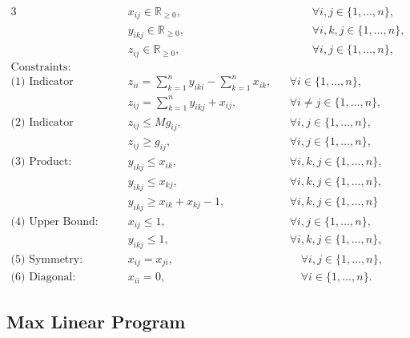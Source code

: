 \documentclass[11pt]{article}
\begin{document}
\begin{alignat}{3}
& x_{ij} \in  \mathbb{R}_{\geq 0}, 
&&\qquad \forall i,j \in \{1, \dots, n\}, \label{eq::LP_x_variable} \\
& y_{ikj} \in \mathbb{R}_{\geq 0}, 
&&\qquad \forall i,k,j \in \{1, \dots, n\}, \label{eq::LP_y_variable} \\
& z_{ij} \in \mathbb{R}_{\geq 0}, 
&&\qquad \forall i,j \in \{1, \dots, n\}, \label{eq::LP_z_variable} \\
\text{Constraints: } & \nonumber \\
\text{(1) Indicator argument: } 
& z_{ii} = \sum_{k = 1}^{n}y_{iki} - \sum_{k = 1}^{n} x_{ik}, 
&& \forall i \in \{1, \dots, n\} , \label{eq::LP_fund_matrix} \\
& z_{ij} = \sum_{k = 1}^{n}y_{ikj} + x_{ij}, 
&& \forall i \neq j \in \{1, \dots, n\} , \label{eq::LP_indicator_arg} \\
\text{(2) Indicator function: } 
& z_{ij} \leq M g_{ij}, 
&& \forall i, j \in \{1, \dots, n\}, \label{eq::LP_indicator_upper} \\
& z_{ij} \geq g_{ij}, 
&& \forall i, j \in \{1, \dots, n\}, \label{eq::LP_indicator_lower}\\
\text{(3) Product: } 
& y_{ikj} \leq x_{ik}, 
&& \forall i, k, j \in \{1, \dots, n\}, \label{eq::LP_product_upper_first} \\
& y_{ikj} \leq x_{kj}, 
&& \forall i, k, j \in \{1, \dots, n\}, \label{eq::LP_product_upper_second} \\
& y_{ikj} \geq x_{ik} + x_{kj} - 1, 
&& \forall i, k, j \in \{1, \dots, n\} \label{eq::LP_product_lower} \\
\text{(4) Upper Bound: } 
& x_{ij} \leq 1, 
&& \forall i, j \in \{1, \dots, n\}, \label{eq::LP_x_upper_bound} \\
& y_{ikj} \leq 1, 
&& \forall i, k, j \in \{1, \dots, n\}, \label{eq::LP_y_upper_bound} \\
\text{(5) Symmetry: } 
& x_{ij} = x_{ji}, 
&&\quad \forall i,j \in \{1, \dots, n\}, \label{eq::LP_symmetry_x} \\
\text{(6) Diagonal: } 
& x_{ii} = 0, 
&&\quad \forall i \in \{1, \dots, n\}.  \label{eq::LP_diagonal_x} 
\end{alignat} \label{eq::linear_program}

\subsection{Max Linear Program} \label{subsec::max_linear_program}
\end{document}
